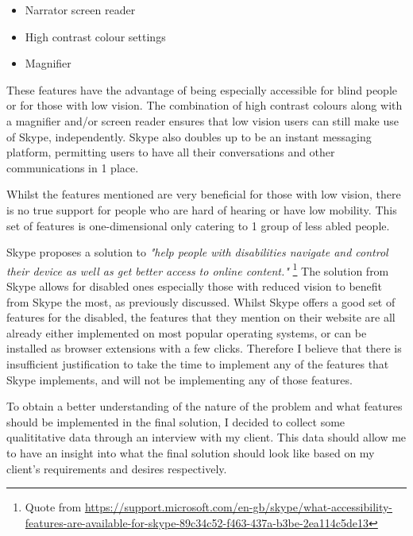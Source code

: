 \begin{itemize}
  \item Narrator screen reader
  \item High contrast colour settings
  \item Magnifier
\end{itemize}

These features have the advantage of being especially 
accessible for blind people or for those with low vision. The 
combination of high contrast colours along with a magnifier 
and/or screen reader ensures that low vision users can still 
make use of Skype, independently. Skype also doubles up to be
an instant messaging platform, permitting users to have all 
their conversations and other communications in 1 place.

\vspace{0.2cm}

Whilst the features mentioned are very beneficial for those 
with low vision, there is no true support for people who are
hard of hearing or have low mobility. This set of features is 
one-dimensional only catering to 1 group of less abled people.

\vspace{0.2cm}

Skype proposes a solution to \textit{"help people with 
disabilities navigate and control their device as well as get
better access to online content."} 
\footnote{Quote from \url{https://support.microsoft.com/en-gb/skype/what-accessibility-features-are-available-for-skype-89c34c52-f463-437a-b3be-2ea114c5de13}}
The solution from Skype allows for disabled ones especially 
those with reduced vision to benefit from Skype the most, as 
previously discussed. Whilst Skype offers a good set of
features for the disabled, the features that they mention on 
their website are all already either implemented on most 
popular operating systems, or can be installed as browser 
extensions with a few clicks. Therefore I believe that there is
insufficient justification to take the time to implement any 
of the features that Skype implements, and will not be 
implementing any of those features.

\vspace{0.2cm}

To obtain a better understanding of the nature of the problem
and what features should be implemented in the final solution,
I decided to collect some qualititative data through an 
interview with my client. This data should allow me to have an
insight into what the final solution should look like based
on my client's requirements and desires respectively.


